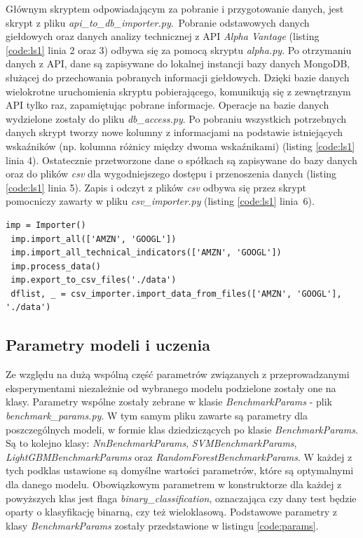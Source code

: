 \documentclass[a4paper, twoside, 11pt, openright]{article}
\begin{document}
Głównym skryptem odpowiadającym za pobranie i przygotowanie danych, jest skrypt z pliku \textit{api\_to\_db\_importer.py}.~Pobranie odstawowych danych giełdowych oraz danych analizy technicznej z API \textit{Alpha Vantage} \cite{alphavantage} (listing \ref{code:ls1} linia 2 oraz 3) odbywa się za pomocą skryptu \textit{alpha.py}. Po otrzymaniu danych z API, dane są zapisywane do lokalnej instancji bazy danych MongoDB, służącej do przechowania pobranych informacji giełdowych. Dzięki bazie danych wielokrotne uruchomienia skryptu pobierającego, komunikują się z zewnętrznym API tylko raz, zapamiętując pobrane informacje. Operacje na bazie danych wydzielone zostały do pliku \textit{db\_access.py}. Po pobraniu wszystkich potrzebnych danych skrypt tworzy nowe kolumny z informacjami na podstawie istniejących wskaźników (np. kolumna różnicy między dwoma wskaźnikami) (listing \ref{code:ls1} linia 4). Ostatecznie przetworzone dane o spółkach są zapisywane do bazy danych oraz do plików \textit{csv} dla wygodniejszego dostępu i przenoszenia danych (listing \ref{code:ls1} linia 5). Zapis i odczyt z plików \textit{csv} odbywa się przez skrypt pomocniczy zawarty w pliku \textit{csv\_importer.py} (listing \ref{code:ls1} linia~6).

\begin{lstlisting}[caption={Pobranie i wstępne przetworzenie danych (plik \textit{api\_to\_db\_importer.py})}, label={code:ls1},frame=single, captionpos=b, mathescape=true]
 imp = Importer()
 imp.import_all(['AMZN', 'GOOGL'])
 imp.import_all_technical_indicators(['AMZN', 'GOOGL'])
 imp.process_data()
 imp.export_to_csv_files('./data')
 dflist, _ = csv_importer.import_data_from_files(['AMZN', 'GOOGL'], './data')
\end{lstlisting}

\subsection*{Parametry modeli i uczenia}

Ze względu na dużą wspólną część parametrów związanych z przeprowadzanymi eksperymentami niezależnie od wybranego modelu podzielone zostały one na klasy. Parametry wspólne zostały zebrane w klasie \textit{BenchmarkParams} - plik \textit{benchmark\_params.py}. W tym samym pliku zawarte są parametry dla poszczególnych modeli, w formie klas dziedziczących po klasie \textit{BenchmarkParams}. Są to kolejno klasy: \textit{NnBenchmarkParams}, \textit{SVMBenchmarkParams}, \textit{LightGBMBenchmarkParams} oraz \textit{RandomForestBenchmarkParams}. W każdej z tych podklas ustawione są domyślne wartości parametrów, które są optymalnymi dla danego modelu. Obowiązkowym parametrem w konstruktorze dla każdej z powyższych klas jest flaga \textit{binary\_classification}, oznaczająca czy dany test będzie oparty o klasyfikację binarną, czy też wieloklasową. Podstawowe parametry z klasy \textit{BenchmarkParams} zostały przedstawione w listingu \ref{code:params}.
\end{document}
